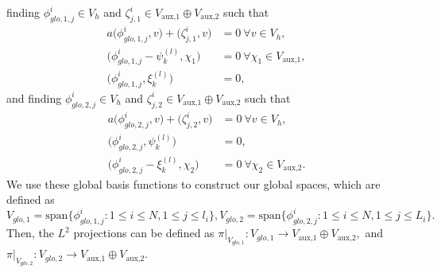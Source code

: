 \documentclass[preprint,12pt]{elsarticle}
\begin{document}
finding $\phi_{glo,1,j}^i\in V_h$ and $\zeta_{j,1}^i\in V_{\text{aux,1}}\oplus V_{\text{aux,2}}$ such that
\begin{equation}\label{eq01}
\begin{aligned}
a\Big(\phi_{glo,1,j}^i,v\Big)+\Big(\zeta_{j,1}^i,v\Big)&=0~\forall v\in V_h,\\
\Big(\phi_{glo,1,j}^i-\psi_k^{(l)},\chi_1\Big)&=0~\forall \chi_1\in V_{\text{aux,1}},\\
\Big(\phi_{glo,1,j}^i,\xi_k^{(l)}\Big)&=0,
\end{aligned}
\end{equation}
and finding $\phi_{glo,2,j}^i\in V_h$ and $\zeta_{j,2}^i\in V_{\text{aux,1}}\oplus V_{\text{aux,2}}$ such that
\begin{equation}\label{eq02}
\begin{aligned}
    a\Big(\phi_{glo,2,j}^i,v\Big)+\Big(\zeta_{j,2}^i,v\Big)&=0~\forall v\in V_h,\\
    \Big(\phi_{glo,2,j}^i,\psi_k^{(l)}\Big)&=0,\\
    \Big(\phi_{glo,2,j}^i-\xi_k^{(l)},\chi_2\Big)&=0~\forall \chi_2\in V_{\text{aux,2}}.
\end{aligned}
\end{equation}
We use these global basis functions to construct our global spaces, which are defined as
$$V_{glo,1}=\text{span}\{\phi_{glo,1,j}^i:1\leq i\leq N,1\leq j\leq l_i\}, V_{glo,2}=\text{span}\{\phi_{glo,2,j}^i:1\leq i\leq N,1\leq j\leq L_i\}.$$
Then, the $L^2$ projections can be defined as $\pi|_{V_{glo,1}}:V_{glo,1}\rightarrow{V_{\text{aux,1}}\oplus V_{\text{aux,2}}},$ and $\pi|_{V_{glo,2}}:V_{glo,2}\rightarrow{V_{\text{aux,1}}\oplus V_{\text{aux,2}}}$.
\end{document}
